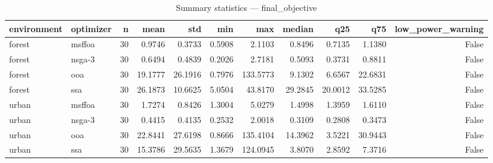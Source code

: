 \begin{table}
\caption{Summary statistics — final_objective}
\label{tab:summary-final_objective}
\begin{tabular}{llrrrrrrrrr}
\toprule
environment & optimizer & n & mean & std & min & max & median & q25 & q75 & low\_power\_warning \\
\midrule
forest & msffoa & 30 & 0.9746 & 0.3733 & 0.5908 & 2.1103 & 0.8496 & 0.7135 & 1.1380 & False \\
forest & nsga-3 & 30 & 0.6494 & 0.4839 & 0.2026 & 2.7181 & 0.5093 & 0.3731 & 0.8811 & False \\
forest & ooa & 30 & 19.1777 & 26.1916 & 0.7976 & 133.5773 & 9.1302 & 6.6567 & 22.6831 & False \\
forest & ssa & 30 & 26.1873 & 10.6625 & 5.0504 & 43.8170 & 29.2845 & 20.0012 & 33.5285 & False \\
urban & msffoa & 30 & 1.7274 & 0.8426 & 1.3004 & 5.0279 & 1.4998 & 1.3959 & 1.6110 & False \\
urban & nsga-3 & 30 & 0.4415 & 0.4135 & 0.2532 & 2.0018 & 0.3109 & 0.2808 & 0.3473 & False \\
urban & ooa & 30 & 22.8441 & 27.6198 & 0.8666 & 135.4104 & 14.3962 & 3.5221 & 30.9443 & False \\
urban & ssa & 30 & 15.3786 & 29.5635 & 1.3679 & 124.0945 & 3.8070 & 2.8592 & 7.3716 & False \\
\bottomrule
\end{tabular}
\end{table}
